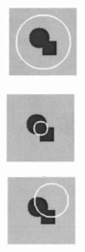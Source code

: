 \begin{figure}[H]
	\captionsetup{justification=centering}	
	\begin{center}
		\begin{subfigure}[t]{2.5in}
			\centering
			\includegraphics[width=.5\textwidth]{./imagenes/chanVese1}
			\subcaption{}\label{chanVese1}
		\end{subfigure}
		\begin{subfigure}[t]{2.5in}
			\centering
			\includegraphics[width=.5\textwidth]{./imagenes/chanVese2}	
			\subcaption{}\label{chanVese2}
		\end{subfigure}
		\begin{subfigure}[t]{2.5in}
			\centering
			\includegraphics[width=.5\textwidth]{./imagenes/chanVese3}	

\end{subfigure}
\end{center}
\end{figure}
